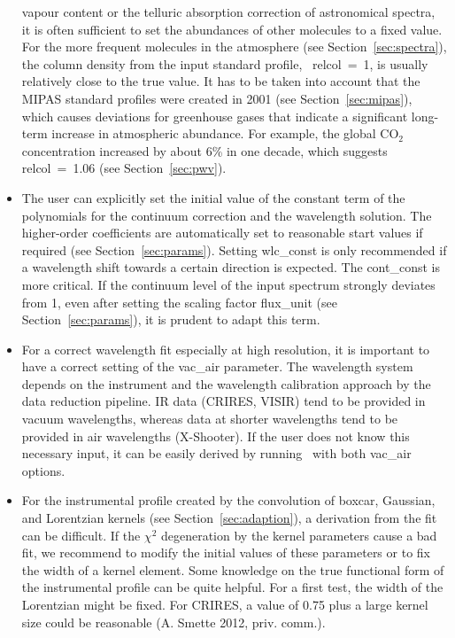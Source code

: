 \begin{itemize}
vapour content or the telluric absorption correction of astronomical spectra,
it is often sufficient to set the abundances of other molecules to a fixed
value. For the more frequent molecules in the atmosphere (see
Section~\ref{sec:spectra}), the column density from the input standard profile,
\ie\ {\sc relcol}~=~1, is usually relatively close to the true value. It has
to be taken into account that the MIPAS standard profiles were created in 2001
(see Section~\ref{sec:mipas}), which causes deviations for greenhouse gases
that indicate a significant long-term increase in atmospheric abundance. For
example, the global CO$_2$ concentration increased by about 6\% in one decade,
which suggests {\sc relcol}~=~1.06 (see Section~\ref{sec:pwv}).
\item The user can explicitly set the initial value of the constant term of
the polynomials for the continuum correction and the wavelength solution. The
higher-order coefficients are automatically set to reasonable start values if
required (see Section~\ref{sec:params}). Setting {\sc wlc\_const} is only
recommended if a wavelength shift towards a certain direction is expected. The
{\sc cont\_const} is more critical. If the continuum level of the input
spectrum strongly deviates from 1, even after setting the scaling factor
{\sc flux\_unit} (see Section~\ref{sec:params}), it is prudent to adapt this
term.
\item For a correct wavelength fit especially at high resolution, it is
important to have a correct setting of the {\sc vac\_air} parameter. The
wavelength system depends on the instrument and the wavelength calibration
approach by the data reduction pipeline. IR data (CRIRES, VISIR) tend to be
provided in vacuum wavelengths, whereas data at shorter wavelengths tend to
be provided in air wavelengths (X-Shooter). If the user does not know this
necessary input, it can be easily derived by running \mf\ with both
{\sc vac\_air} options.
\item For the instrumental profile created by the convolution of boxcar,
Gaussian, and Lorentzian kernels (see Section~\ref{sec:adaption}), a derivation
from the fit can be difficult. If the $\chi^2$ degeneration by the kernel
parameters cause a bad fit, we recommend to modify the initial values of these
parameters or to fix the width of a kernel element. Some knowledge on the true
functional form of the instrumental profile can be quite helpful. For a first
test, the width of the Lorentzian might be fixed. For CRIRES, a value of 0.75
plus a large kernel size could be reasonable (A. Smette 2012, priv. comm.).

\end{itemize}
